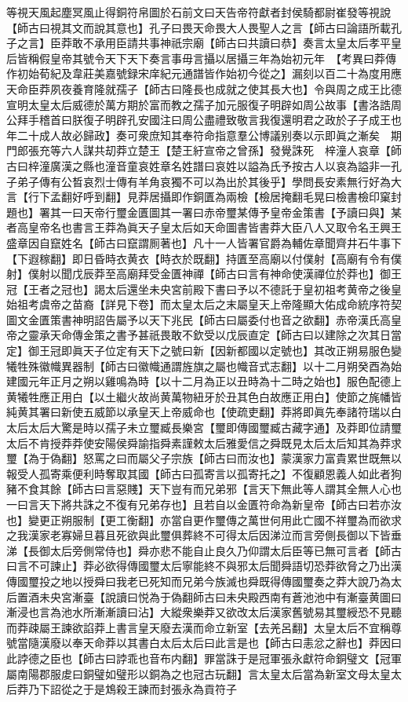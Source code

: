 等視天風起塵冥風止得銅符帛圖於石前文曰天告帝符獻者封侯騎都尉崔發等視說【師古曰視其文而說其意也】孔子曰畏天命畏大人畏聖人之言【師古曰論語所載孔子之言】臣莽敢不承用臣請共事神祇宗廟【師古曰共讀曰恭】奏言太皇太后孝平皇后皆稱假皇帝其號令天下天下奏言事毋言攝以居攝三年為始初元年　【考異曰莽傳作初始荀紀及韋莊美嘉號録宋庠紀元通譜皆作始初今從之】漏刻以百二十為度用應天命臣莽夙夜養育隆就孺子【師古曰隆長也成就之使其長大也】令與周之成王比德宣明太皇太后威德於萬方期於富而教之孺子加元服復子明辟如周公故事【書洛誥周公拜手稽首曰朕復子明辟孔安國注曰周公盡禮致敬言我復還明君之政於子子成王也年二十成人故必歸政】奏可衆庶知其奉符命指意羣公博議别奏以示即眞之漸矣　期門郎張充等六人謀共刧莽立楚王【楚王紆宣帝之曾孫】發覺誅死　梓潼人哀章【師古曰梓潼廣漢之縣也潼音童哀姓章名姓譜曰哀姓以謚為氏予按古人以哀為謚非一孔子弟子傳有公晳哀烈士傳有羊角哀獨不可以為出於其後乎】學問長安素無行好為大言【行下孟翻好呼到翻】見莽居攝即作銅匱為兩檢【檢居掩翻毛晃曰檢書檢印窠封題也】署其一曰天帝行璽金匱圖其一署曰赤帝璽某傳予皇帝金策書【予讀曰與】某者高皇帝名也書言王莽為眞天子皇太后如天命圖書皆書莽大臣八人又取令名王興王盛章因自竄姓名【師古曰竄謂厠著也】凡十一人皆署官爵為輔佐章聞齊井石牛事下【下遐稼翻】即日昏時衣黄衣【時衣於既翻】持匱至高廟以付僕射【高廟有令有僕射】僕射以聞戊辰莽至高廟拜受金匱神禪【師古曰言有神命使漢禪位於莽也】御王冠【王者之冠也】謁太后還坐未央宮前殿下書曰予以不德託于皇初祖考黄帝之後皇始祖考虞帝之苗裔【詳見下卷】而太皇太后之末屬皇天上帝隆顯大佑成命統序符契圖文金匱策書神明詔告屬予以天下兆民【師古曰屬委付也音之欲翻】赤帝漢氏高皇帝之靈承天命傳金策之書予甚祇畏敢不欽受以戊辰直定【師古曰以建除之次其日當定】御王冠即眞天子位定有天下之號曰新【因新都國以定號也】其改正朔易服色變犧牲殊徽幟異器制【師古曰徽幟通謂旌旗之屬也幟音式志翻】以十二月朔癸酉為始建國元年正月之朔以雞鳴為時【以十二月為正以丑時為十二時之始也】服色配德上黄犧牲應正用白【以土繼火故尚黄萬物紐牙於丑其色白故應正用白】使節之旄幡皆純黄其署曰新使五威節以承皇天上帝威命也【使疏吏翻】莽將即眞先奉諸符瑞以白太后太后大驚是時以孺子未立璽臧長樂宮【璽即傳國璽臧古藏字通】及莽即位請璽太后不肯授莽莽使安陽侯舜諭指舜素謹敕太后雅愛信之舜既見太后太后知其為莽求璽【為于偽翻】怒罵之曰而屬父子宗族【師古曰而汝也】蒙漢家力富貴累世既無以報受人孤寄乘便利時奪取其國【師古曰孤寄言以孤寄托之】不復顧恩義人如此者狗豬不食其餘【師古曰言惡賤】天下豈有而兄弟邪【言天下無此等人謂其全無人心也一曰言天下將共誅之不復有兄弟存也】且若自以金匱符命為新皇帝【師古曰若亦汝也】變更正朔服制【更工衡翻】亦當自更作璽傳之萬世何用此亡國不祥璽為而欲求之我漢家老寡婦旦暮且死欲與此璽俱葬終不可得太后因涕泣而言旁側長御以下皆垂涕【長御太后旁側常侍也】舜亦悲不能自止良久乃仰謂太后臣等已無可言者【師古曰言不可諫止】莽必欲得傳國璽太后寧能終不與邪太后聞舜語切恐莽欲脅之乃出漢傳國璽投之地以授舜曰我老已死知而兄弟今族滅也舜既得傳國璽奏之莽大說乃為太后置酒未央宮漸臺【說讀曰悦為于偽翻師古曰未央殿西南有蒼池池中有漸臺黄圖曰漸浸也言為池水所漸漸讀曰沾】大縱衆樂莽又欲改太后漢家舊號易其璽綬恐不見聽而莽疎屬王諫欲諂莽上書言皇天廢去漢而命立新室【去羌呂翻】太皇太后不宜稱尊號當隨漢廢以奉天命莽以其書白太后太后曰此言是也【師古曰恚忿之辭也】莽因曰此誖德之臣也【師古曰誖乖也音布内翻】罪當誅于是冠軍張永獻符命銅璧文【冠軍屬南陽郡服䖍曰銅璧如璧形以銅為之也冠古玩翻】言太皇太后當為新室文母太皇太后莽乃下詔從之于是鴆殺王諫而封張永為貢符子

